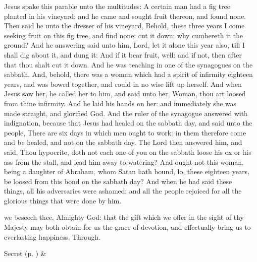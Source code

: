 
 Jesus spake this parable unto the multitudes: A certain man had a fig tree planted in his vineyard; and he came and sought fruit thereon, and found none. Then said he unto the dresser of his vineyard, Behold, these three years I come seeking fruit on this fig tree, and find none: cut it down; why cumbereth it the ground? And he answering said unto him, Lord, let it alone this year also, till I shall dig about it, and dung it: And if it bear fruit, well: and if not, then after that thou shalt cut it down. And he was teaching in one of the synagogues on the sabbath. And, behold, there was a woman which had a spirit of infirmity eighteen years, and was bowed together, and could in no wise lift up herself. And when Jesus saw her, he called her to him, and said unto her, Woman, thou art loosed from thine infirmity. And he laid his hands on her: and immediately she was made straight, and glorified God. And the ruler of the synagogue answered with indignation, because that Jesus had healed on the sabbath day, and said unto the people, There are six days in which men ought to work: in them therefore come and be healed, and not on the sabbath day. The Lord then answered him, and said, Thou hypocrite, doth not each one of you on the sabbath loose his ox or his ass from the stall, and lead him away to watering? And ought not this woman, being a daughter of Abraham, whom Satan hath bound, lo, these eighteen years, be loosed from this bond on the sabbath day? And when he had said these things, all his adversaries were ashamed: and all the people rejoiced for all the glorious things that were done by him.


\secret
{} we beseech thee, Almighty God: that the gift which we offer in the sight of thy Majesty may both obtain for us the grace of devotion, and effectually bring us to everlasting happiness. Through.
\begin{rubric}
     Secret  (p. \pageref{SPSaints}) \&  
\end{rubric}


